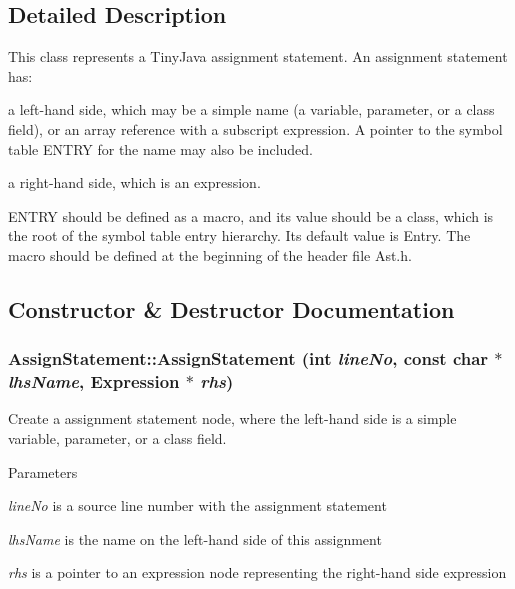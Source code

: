 \subsection{Detailed Description}
This class represents a TinyJava assignment statement. An assignment statement has:
\begin{DoxyItemize}
\item a left-\/hand side, which may be a simple name (a variable, parameter, or a class field), or an array reference with a subscript expression. A pointer to the symbol table ENTRY for the name may also be included.
\item a right-\/hand side, which is an expression.
\end{DoxyItemize}

ENTRY should be defined as a macro, and its value should be a class, which is the root of the symbol table entry hierarchy. Its default value is Entry. The macro should be defined at the beginning of the header file Ast.h. 

\subsection{Constructor \& Destructor Documentation}
\hypertarget{classAssignStatement_ad2cc7d861f58d9ebe7302aeca01975fb}{
\subsubsection[{AssignStatement}]{\setlength{\rightskip}{0pt plus 5cm}AssignStatement::AssignStatement (int {\em lineNo}, \/  const char $\ast$ {\em lhsName}, \/  {\bf Expression} $\ast$ {\em rhs})}}
\label{classAssignStatement_ad2cc7d861f58d9ebe7302aeca01975fb}
Create a assignment statement node, where the left-\/hand side is a simple variable, parameter, or a class field. 
\begin{DoxyParams}{Parameters}
\item[{\em lineNo}]is a source line number with the assignment statement \item[{\em lhsName}]is the name on the left-\/hand side of this assignment \item[{\em rhs}]is a pointer to an expression node representing the right-\/hand side expression \end{DoxyParams}

